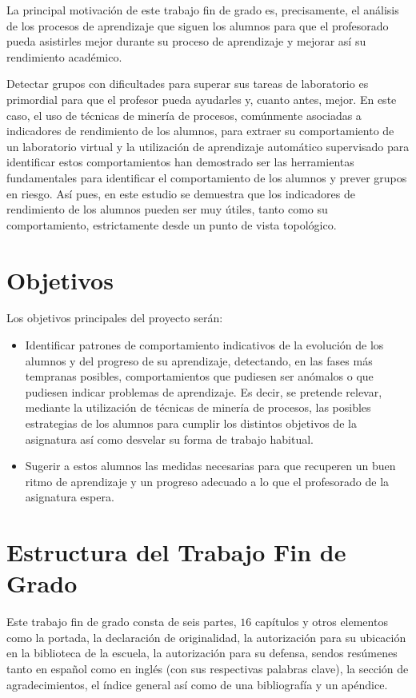 La principal motivación de este trabajo fin de grado es, precisamente, el análisis de los procesos de aprendizaje que siguen los alumnos para que el profesorado pueda asistirles mejor durante su proceso de aprendizaje y mejorar así su rendimiento académico.

Detectar grupos con dificultades para superar sus tareas de laboratorio es primordial para que el profesor pueda ayudarles y, cuanto antes, mejor. En este caso, el uso de técnicas de minería de procesos, comúnmente asociadas a indicadores de rendimiento de los alumnos, para extraer su comportamiento de un laboratorio virtual y la utilización de aprendizaje automático supervisado para identificar estos comportamientos han demostrado ser las herramientas fundamentales para identificar el comportamiento de los alumnos y prever grupos en riesgo. Así pues, en este estudio se demuestra que los indicadores de rendimiento de los alumnos pueden ser muy útiles, tanto como su comportamiento, estrictamente desde un punto de vista topológico.

\section{Objetivos}

Los objetivos principales del proyecto serán:
\begin{itemize}
\item Identificar patrones de comportamiento indicativos de la evolución de los alumnos y del progreso de su aprendizaje, detectando, en las fases más tempranas posibles, comportamientos que pudiesen ser anómalos o que pudiesen indicar problemas de aprendizaje. Es decir, se pretende relevar, mediante la utilización de técnicas de minería de procesos, las posibles estrategias de los alumnos para cumplir los distintos objetivos de la asignatura así como desvelar su forma de trabajo habitual.
\item Sugerir a estos alumnos las medidas necesarias para que recuperen un buen ritmo de aprendizaje y un progreso adecuado a lo que el profesorado de la asignatura espera.
\end{itemize}

\section{Estructura del Trabajo Fin de Grado}

Este trabajo fin de grado consta de seis partes, $16$ capítulos y otros elementos como la portada, la declaración de originalidad, la autorización para su ubicación en la biblioteca de la escuela, la autorización para su defensa, sendos resúmenes tanto en español como en inglés (con sus respectivas palabras clave), la sección de agradecimientos, el índice general así como de una bibliografía y un apéndice.

